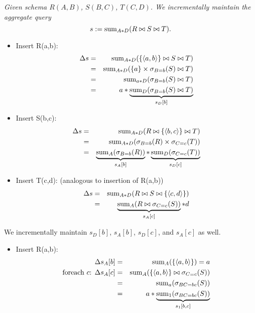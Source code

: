 






\begin{example}\em
Given schema $R(A,B)$, $S(B,C)$, $T(C,D)$.
We incrementally maintain the aggregate query
\[
s := \mathrm{sum}_{A*D}(R \bowtie S \bowtie T).
\]
\begin{itemize}
\item
Insert R(a,b):
\begin{eqnarray*}
\Delta s &=& \mathrm{sum}_{A*D}(\{{\langle a,b\rangle}\} \bowtie S \bowtie T)
\\ &=&
\mathrm{sum}_{A*D}(\{a\} \times \sigma_{B=b}(S) \bowtie T)
\\ &=&
\mathrm{sum}_{a*D}(\sigma_{B=b}(S) \bowtie T)
\\ &=&
a * \underbrace{\mathrm{sum}_{D}(\sigma_{B=b}(S) \bowtie T)}_{s_D[b]}
\end{eqnarray*}

\item
Insert S(b,c):
\begin{eqnarray*}
\Delta s &=& \mathrm{sum}_{A*D}(R \bowtie \{{\langle b,c\rangle}\} \bowtie T)
\\ &=&
\mathrm{sum}_{A*D}(\sigma_{B=b}(R) \times \sigma_{C=c}(T))
\\ &=&
\underbrace{\mathrm{sum}_{A}(\sigma_{B=b}(R))}_{s_A[b]} *
\underbrace{\mathrm{sum}_{D}(\sigma_{C=c}(T))}_{s_D[c]}
\end{eqnarray*}

\item
Insert T(c,d): (analogous to insertion of R(a,b))
\begin{eqnarray*}
\Delta s &=& \mathrm{sum}_{A*D}(R \bowtie S \bowtie \{{\langle c,d\rangle}\})
\\ &=&
\underbrace{\mathrm{sum}_{A}(R \bowtie \sigma_{C=c}(S))}_{s_A[c]} * d
\end{eqnarray*}
\end{itemize}

We incrementally maintain $s_D[b]$, $s_A[b]$, $s_D[c]$, and
$s_A[c]$ as well.

\begin{itemize}
\item
Insert R(a,b):
\begin{eqnarray*}
\Delta s_A[b] &=& \mathrm{sum}_{A}(\{{\langle a,b\rangle}\}) = a
\\
\mbox{foreach $c$: }
\Delta s_A[c] &=& \mathrm{sum}_{A}(\{{\langle a,b\rangle}\} \bowtie \sigma_{C=c}(S))
\\ &=&
\mathrm{sum}_{a}(\sigma_{BC=bc}(S))
\\ &=&
a * \underbrace{\mathrm{sum}_{1}(\sigma_{BC=bc}(S))}_{s_1[b,c]}
\end{eqnarray*}


\end{itemize}
\end{example}
